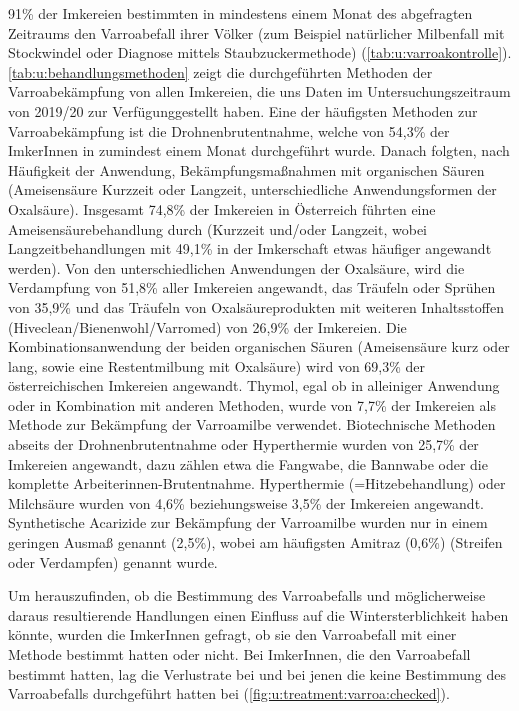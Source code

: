 91\% der Imkereien bestimmten in mindestens einem Monat des abgefragten Zeitraums den Varroabefall ihrer Völker (zum Beispiel natürlicher Milbenfall mit Stockwindel oder Diagnose mittels Staubzuckermethode) (\cref{tab:u:varroakontrolle}). 
\newline
\cref{tab:u:behandlungsmethoden} zeigt die durchgeführten Methoden der Varroabekämpfung von allen Imkereien, die uns Daten im Untersuchungszeitraum von 2019/20 zur Verfügunggestellt haben.
\newline
Eine der häufigsten Methoden zur Varroabekämpfung ist die Drohnenbrutentnahme, welche von 54,3\% der ImkerInnen in zumindest einem Monat durchgeführt wurde. Danach folgten, nach Häufigkeit der Anwendung, Bekämpfungsmaßnahmen mit organischen Säuren (Ameisensäure Kurzzeit oder Langzeit, unterschiedliche Anwendungsformen der Oxalsäure). Insgesamt 74,8\% der Imkereien in Österreich führten eine Ameisensäurebehandlung durch (Kurzzeit und/oder Langzeit, wobei Langzeitbehandlungen mit 49,1\% in der Imkerschaft etwas häufiger angewandt werden). Von den unterschiedlichen Anwendungen der Oxalsäure, wird die Verdampfung von 51,8\% aller Imkereien angewandt, das Träufeln oder Sprühen von 35,9\% und das Träufeln von Oxalsäureprodukten mit weiteren Inhaltsstoffen (Hiveclean/Bienenwohl/Varromed) von 26,9\% der Imkereien. Die Kombinationsanwendung der beiden organischen Säuren (Ameisensäure kurz oder lang, sowie eine Restentmilbung mit Oxalsäure) wird von 69,3\% der österreichischen Imkereien angewandt. Thymol, egal ob in alleiniger Anwendung oder in Kombination mit anderen Methoden, wurde von 7,7\% der Imkereien als Methode zur Bekämpfung der Varroamilbe verwendet. Biotechnische Methoden abseits der Drohnenbrutentnahme oder Hyperthermie wurden von 25,7\% der Imkereien angewandt, dazu zählen etwa die Fangwabe, die Bannwabe oder die komplette Arbeiterinnen-Brutentnahme. Hyperthermie (=Hitzebehandlung) oder Milchsäure wurden von 4,6\% beziehungsweise 3,5\% der Imkereien angewandt. Synthetische Acarizide zur Bekämpfung der Varroamilbe wurden nur in einem geringen Ausmaß genannt (2,5\%), wobei am häufigsten Amitraz (0,6\%) (Streifen oder Verdampfen) genannt wurde.






Um herauszufinden, ob die Bestimmung des Varroabefalls und möglicherweise daraus resultierende Handlungen einen Einfluss auf die Wintersterblichkeit haben könnte, wurden die ImkerInnen gefragt, ob sie den Varroabefall mit einer Methode bestimmt hatten oder nicht. Bei ImkerInnen, die den Varroabefall bestimmt hatten, lag die Verlustrate bei  und bei jenen die keine Bestimmung des Varroabefalls durchgeführt hatten bei  (\cref{fig:u:treatment:varroa:checked}).

